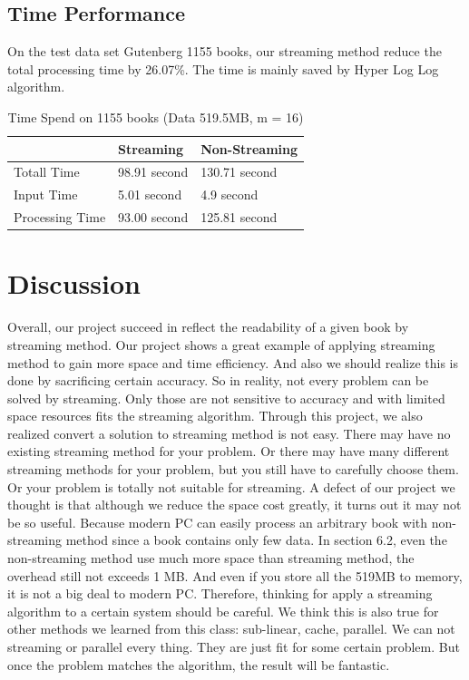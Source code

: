 \documentclass{article}
\begin{document}
\subsection{Time Performance}
On the test data set Gutenberg 1155 books, our streaming method reduce the total processing time by 26.07\%. The time is mainly saved by Hyper Log Log algorithm.
\begin{table}[H]
\begin{center}
\begin{tabular}{ | m{10em} | m{10em}| m{10em} | } 
\hline
& Streaming  & Non-Streaming \\ 
\hline
Totall Time & 98.91 second & 130.71 second \\ 
\hline
Input Time & 5.01 second & 4.9 second \\
\hline
Processing Time & 93.00 second & 125.81 second \\
\hline
\end{tabular}
\end{center}
\caption{Time Spend on 1155 books (Data 519.5MB, m = 16)} \label{tab: testtime}
\end{table}
\section{Discussion}
Overall, our project succeed in reflect the readability of a given book by streaming method. Our project shows a great example of applying streaming method to gain more space and time efficiency. And also we should realize this is done by sacrificing certain accuracy. So in reality, not every problem can be solved by streaming. Only those are not sensitive to accuracy and with limited space resources fits the streaming algorithm.
\newline
\newline
Through this project, we also realized convert a solution to streaming method is not easy. There may have no existing streaming method for your problem. Or there may have many different streaming methods for your problem, but you still have to carefully choose them. Or your problem is totally not suitable for streaming. A defect of our project we thought is that although we reduce the space cost greatly, it turns out it may not be so useful. Because modern PC can easily process an arbitrary book with non-streaming method since a book contains only few data. In section 6.2, even the non-streaming method use much more space than streaming method, the overhead still not exceeds 1 MB. And even if you store all the 519MB to memory, it is not a big deal to modern PC. Therefore, thinking for apply a streaming algorithm to a certain system should be careful.
\newline
\newline
We think this is also true for other methods we learned from this class: sub-linear, cache, parallel. We can not streaming or parallel every thing. They are just fit for some certain problem. But once the problem matches the algorithm, the result will be fantastic.
\end{document}
